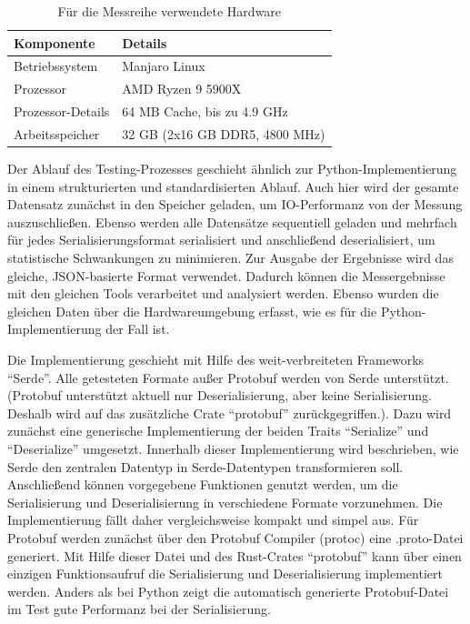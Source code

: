 \documentclass[ngerman]{seminarvorlage}
\begin{document}
\begin{table}[h!]
  \centering
  \begin{tabular}{|l|l|}
  \hline
  \textbf{Komponente}         & \textbf{Details}                     \\ \hline
  Betriebssystem              & Manjaro Linux                        \\ \hline
  Prozessor                   & AMD Ryzen 9 5900X                    \\ \hline
  Prozessor-Details           & 64 MB Cache, bis zu 4.9 GHz          \\ \hline
  Arbeitsspeicher             & 32 GB (2x16 GB DDR5, 4800 MHz)       \\ \hline
  \end{tabular}
  \caption{Für die Messreihe verwendete Hardware}
  \label{tab:hardware_rust}
\end{table}

Der Ablauf des Testing-Prozesses geschieht ähnlich zur Python-Implementierung in einem strukturierten und standardisierten Ablauf. Auch hier wird der gesamte Datensatz zunächst in den Speicher geladen, um IO-Performanz von der Messung auszuschließen. Ebenso werden alle Datensätze sequentiell geladen und mehrfach für jedes Serialisierungsformat serialisiert und anschließend deserialisiert, um statistische Schwankungen zu minimieren. Zur Ausgabe der Ergebnisse wird das gleiche, JSON-basierte Format verwendet. Dadurch können die Messergebnisse mit den gleichen Tools verarbeitet und analysiert werden. Ebenso wurden die gleichen Daten über die Hardwareumgebung erfasst, wie es für die Python-Implementierung der Fall ist.

Die Implementierung geschieht mit Hilfe des weit-verbreiteten \cite{serde} Frameworks ``Serde''. Alle getesteten Formate außer Protobuf werden von Serde unterstützt. (Protobuf unterstützt aktuell nur Deserialisierung, aber keine Serialisierung. Deshalb wird auf das zusätzliche Crate ``protobuf'' zurückgegriffen.). Dazu wird zunächst eine generische Implementierung der beiden Traits ``Serialize'' und ``Deserialize'' umgesetzt. Innerhalb dieser Implementierung wird beschrieben, wie Serde den zentralen Datentyp in Serde-Datentypen transformieren soll. Anschließend können vorgegebene Funktionen genutzt werden, um die Serialisierung und Deserialisierung in verschiedene Formate vorzunehmen. Die Implementierung fällt daher vergleichsweise kompakt und simpel aus. Für Protobuf werden zunächst über den Protobuf Compiler (protoc) eine .proto-Datei generiert. Mit Hilfe dieser Datei und des Rust-Crates ``protobuf'' kann über einen einzigen Funktionsaufruf die Serialisierung und Deserialisierung implementiert werden. Anders als bei Python zeigt die automatisch generierte Protobuf-Datei im Test gute Performanz bei der Serialisierung.
\end{document}
